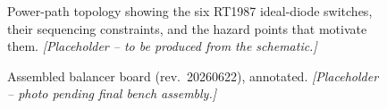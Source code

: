 \begin{figure}[H]
  \centering
  \caption{Power-path topology showing the six RT1987 ideal-diode
    switches, their sequencing constraints, and the hazard points that
    motivate them. \emph{[Placeholder -- to be produced from the
    schematic.]}}
  \label{fig:power-path-topology}
\end{figure}

\begin{figure}[H]
  \centering
  \caption{Assembled balancer board (rev.\ 20260622), annotated.
    \emph{[Placeholder -- photo pending final bench assembly.]}}
  \label{fig:board-photo}
\end{figure}

